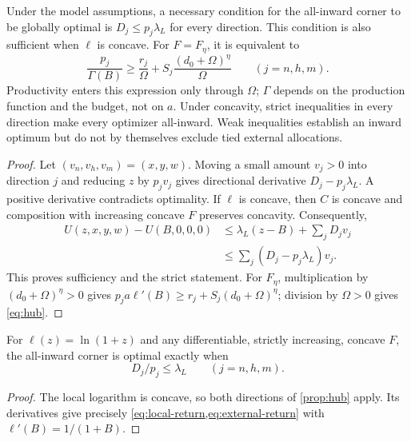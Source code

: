 \begin{proposition}
\label{prop:hub}
Under the model assumptions, a necessary condition for the all-inward
corner to be globally optimal is
$D_j\leq p_j\lambda_L$ for every direction. This condition is also
sufficient when $\ell$ is concave. For $F=F_\eta$, it is equivalent to
\begin{equation}
 \boxed{\frac{p_j}{\Gamma(B)}\geq
 \frac{r_j}{\Omega}
 +S_j\frac{(d_0+\Omega)^\eta}{\Omega}}
 \qquad(j=n,h,m).
 \label{eq:hub}
\end{equation}
Productivity enters this expression only through $\Omega$; $\Gamma$
depends on the production function and the budget, not on $a$.
Under concavity, strict inequalities in every direction make every
optimizer all-inward. Weak inequalities establish an inward optimum
but do not by themselves exclude tied external allocations.
\end{proposition}
\begin{proof}
Let $(v_n,v_h,v_m)=(x,y,w)$. Moving a small amount $v_j>0$ into direction
$j$ and reducing $z$ by $p_jv_j$ gives directional derivative
$D_j-p_j\lambda_L$. A positive derivative contradicts optimality.
If $\ell$ is concave, then $C$ is concave and composition with increasing
concave $F$ preserves concavity. Consequently,
\begin{align}
 U(z,x,y,w)-U(B,0,0,0)
 &\leq\lambda_L(z-B)+\sum_jD_jv_j\nonumber\\
 &\leq\sum_j(D_j-p_j\lambda_L)v_j.
 \label{eq:cornerproof}
\end{align}
This proves sufficiency and the strict statement. For $F_\eta$,
multiplication by $(d_0+\Omega)^\eta>0$ gives
$p_ja\ell'(B)\geq r_j+S_j(d_0+\Omega)^\eta$; division by
$\Omega>0$ gives \cref{eq:hub}.
\end{proof}

\begin{corollary}
\label{prop:corner}
For $\ell(z)=\ln(1+z)$ and any differentiable, strictly increasing,
concave $F$, the all-inward corner is optimal exactly when
\begin{equation}
 D_j/p_j\leq\lambda_L\qquad(j=n,h,m).
 \label{eq:corner}
\end{equation}
\end{corollary}
\begin{proof}
The local logarithm is concave, so both directions of
\cref{prop:hub} apply. Its derivatives give precisely
\cref{eq:local-return,eq:external-return} with
$\ell'(B)=1/(1+B)$.
\end{proof}

